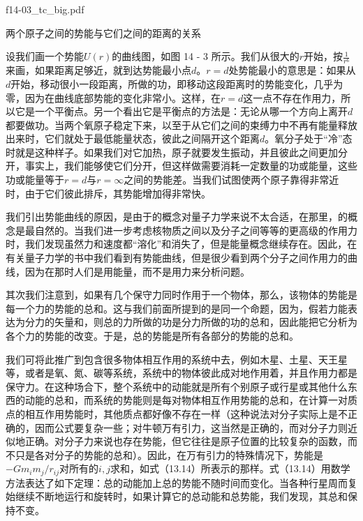 \documentclass[12pt,oneside]{book}
\begin{document}
\begin{fig}{f14-03_tc_big.pdf}
\caption{两个原子之间的势能与它们之间的距离的关系}
\label{fig:14-3}
\end{fig}

设我们画一个势能$U(r)$的曲线图，如图 14 - 3 所示。我们从很大的$r$开始，按$\frac{1}{r^6}$来画，如果距离足够近，就到达势能最小点$d$。$r = d$处势能最小的意思是：如果从$d$开始，移动很小一段距离，所做的功，即移动这段距离时的势能变化，几乎为零，因为在曲线底部势能的变化非常小。这样，在$r = d$这一点不存在作用力，所以它是一个平衡点。另一个看出它是平衡点的方法是：无论从哪一个方向上离开$d$都要做功。当两个氧原子稳定下来，以至于从它们之间的束缚力中不再有能量释放出来时，它们就处于最低能量状态，彼此之间隔开这个距离$d$。氧分子处于“冷”态时就是这种样子。如果我们对它加热，原子就要发生振动，并且彼此之间更加分开，事实上，我们能够使它们分开，但这样做需要消耗一定数量的功或能量，这些功或能量等于$r = d$与$r = \infty$之间的势能差。当我们试图使两个原子靠得非常近时，由于它们彼此排斥，其势能增加得非常快。


我们引出势能曲线的原因，是由于的概念对量子力学来说不太合适，在那里，的概念是最自然的。当我们进一步考虑核物质之间以及分子之间等等的更高级的作用力时，我们发现虽然力和速度都“溶化”和消失了，但是能量概念继续存在。因此，在有关量子力学的书中我们看到有势能曲线，但是很少看到两个分子之间作用力的曲线，因为在那时人们是用能量，而不是用力来分析问题。


其次我们注意到，如果有几个保守力同时作用于一个物体，那么，该物体的势能是每一个力的势能的总和。这与我们前面所提到的是同一个命题，因为，假若力能表达为分力的矢量和，则总的力所做的功是分力所做的功的总和，因此能把它分析为各个力的势能的改变。于是，总的势能是所有各部分的势能的总和。


我们可将此推广到包含很多物体相互作用的系统中去，例如木星、土星、天王星等，或者是氧、氮、碳等系统，系统中的物体彼此成对地作用着，并且作用力都是保守力。在这种场合下，整个系统中的动能就是所有个别原子或行星或其他什么东西的动能的总和，而系统的势能则是每对物体相互作用势能的总和，在计算一对质点的相互作用势能时，其他质点都好像不存在一样（这种说法对分子实际上是不正确的，因而公式要复杂一些；对牛顿万有引力，这当然是正确的，而对分子力则近似地正确。对分子力来说也存在势能，但它往往是原子位置的比较复杂的函数，而不只是各对分子的势能的总和）。因此，在万有引力的特殊情况下，势能是$-Gm_im_j/r_{ij}$对所有的$i,j$求和，如式（13.14）所表示的那样。式（13.14）用数学方法表达了如下定理：总的动能加上总的势能不随时间而变化。当各种行星周而复始继续不断地运行和旋转时，如果计算它的总动能和总势能，我们发现，其总和保持不变。
\end{document}
